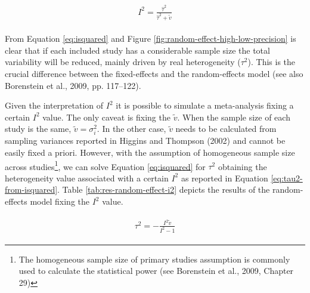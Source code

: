 \documentclass[
  man,floatsintext]{apa6}
\begin{document}
\begin{align}
\begin{gathered}
I^2 = \frac{\hat{\tau}^2}{\hat{\tau}^2 + \tilde{v}}
\label{eq:isquared}
\end{gathered}
\end{align}

From Equation \eqref{eq:isquared} and Figure \ref{fig:random-effect-high-low-precision} is clear that if each included study has a considerable sample size the total variability will be reduced, mainly driven by real heterogeneity (\(\tau^2\)). This is the crucial difference between the fixed-effects and the random-effects model (see also Borenstein et al., 2009, pp. 117--122).

Given the interpretation of \(I^{2}\) it is possible to simulate a meta-analysis fixing a certain \(I^{2}\) value. The only caveat is fixing the \(\tilde{v}\). When the sample size of each study is the same, \(\tilde{v} = \sigma^2_i\). In the other case, \(\tilde{v}\) needs to be calculated from sampling variances reported in Higgins and Thompson (2002) and cannot be easily fixed a priori. However, with the assumption of homogeneous sample size across studies\footnote{The homogeneous sample size of primary studies assumption is commonly used to calculate the statistical power (see Borenstein et al., 2009, Chapter 29)}, we can solve Equation \eqref{eq:isquared} for \(\tau^{2}\) obtaining the heterogeneity value associated with a certain \(I^{2}\) as reported in Equation \eqref{eq:tau2-from-isquared}. Table \ref{tab:res-random-effect-i2} depicts the results of the random-effects model fixing the \(I^{2}\) value.

\begin{align}
\begin{gathered}
\tau^2 = - \frac{I^2\tilde{v}}{I^2 - 1}
\label{eq:tau2-from-isquared}
\end{gathered}
\end{align}

\scriptsize
\end{document}
